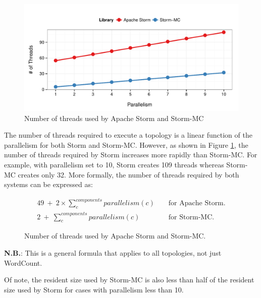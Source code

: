 \documentclass[bsc,logo,frontabs,twoside,singlespacing,normalheadings,parskip]{infthesis}\usepackage[]{graphicx}\usepackage[]{color}
\makeatletter
\def\maxwidth{ %
  \ifdim\Gin@nat@width>\linewidth
    \linewidth
  \else
    \Gin@nat@width
  \fi
}
\newenvironment{knitrout}{}{} %
\makeatother
\begin{document}
\begin{knitrout}
\color{fgcolor}\begin{figure}[!htb]

{\centering \includegraphics[width=\maxwidth]{figure/threads-plot-1} 

}

\caption[Number of threads used by Apache Storm and Storm-MC]{Number of threads used by Apache Storm and Storm-MC}\label{fig:threads-plot}
\end{figure}


\end{knitrout}

The number of threads required to execute a topology is a linear function of the parallelism for both Storm and Storm-MC. However, as shown in Figure \ref{fig:threads-plot}, the number of threads required by Storm increases more rapidly than Storm-MC. For example, with parallelism set to 10, Storm creates 109 threads whereas Storm-MC creates only 32. More formally, the number of threads required by both systems can be expressed as:

\begin{figure}[!htb]
\begin{eqnarray*}
	49 \ + \ 2 \times \sum\limits_{c}^{components} parallelism(c) && \text{ for Apache Storm.} \\
	2 \ + \ \sum\limits_{c}^{components} parallelism(c) && \text{ for Storm-MC.}
\end{eqnarray*}
\caption{Number of threads used by Apache Storm and Storm-MC.}
\end{figure}

\textbf{N.B.}\@\xspace: This is a general formula that applies to all topologies, not just WordCount.

Of note, the resident size used by Storm-MC is also less than half of the resident size used by Storm for cases with parallelism less than 10.
\end{document}
